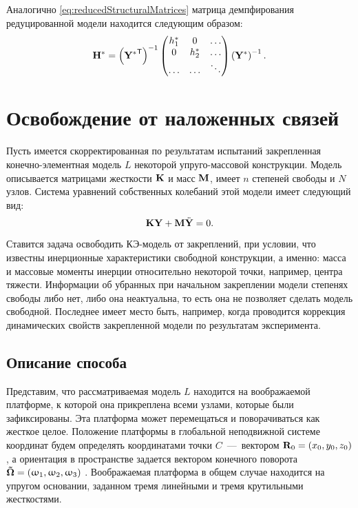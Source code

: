 Аналогично \eqref{eq:reducedStructuralMatrices} матрица демпфирования редуцированной модели находится следующим образом:
\begin{equation}
	\mathbf{H} ^ \ast = 
	\left( \mathbf{Y ^ \ast} ^ \mathsf{T} \right) ^ {-1} 
	\begin{pmatrix}
		h_1^\ast & 0 & \hdots \\
		0 & h_2^\ast & \hdots \\
		\hdots & \hdots & \ddots
	\end{pmatrix} 
	\left( \mathbf{Y} ^ \ast \right) ^ {-1}.
	\label{eq:reducedDampingMatrix}
\end{equation}

\section{Освобождение от наложенных связей} \label{struct:freeing}

Пусть имеется скорректированная по результатам испытаний закрепленная конечно-элементная модель $ L $ некоторой упруго-массовой конструкции. Модель описывается матрицами жесткости $ \mathbf{K} $  и масс $ \mathbf{M} $, имеет $ n $  степеней свободы и $ N $ узлов. Система уравнений собственных колебаний этой модели имеет следующий вид:
\begin{equation}
	\mathbf{K} \mathbf{Y} + \mathbf{M} \ddot{\mathbf{Y}} = 0.
	\label{eq:eigFreeProblem}
\end{equation}

Ставится задача освободить КЭ-модель от закреплений, при условии, что известны инерционные характеристики свободной конструкции, а именно: масса и массовые моменты инерции относительно некоторой точки, например, центра тяжести. Информации об убранных при начальном закреплении модели степенях свободы либо нет, либо она неактуальна, то есть она не позволяет сделать модель свободной. Последнее имеет место быть, например, когда проводится коррекция динамических свойств закрепленной модели по результатам эксперимента.

\subsection{Описание способа}

Представим, что рассматриваемая модель $ L $ находится на воображаемой платформе, к которой она прикреплена всеми узлами, которые были зафиксированы. Эта платформа может перемещаться и поворачиваться как жесткое целое. Положение платформы в глобальной неподвижной системе координат будем определять координатами точки $ C $~---~вектором $ \mathbf{R}_0 = (x_0, y_0, z_0) $, а ориентация в пространстве задается вектором конечного поворота $ \mathbf{\vec{\mathbf{\Omega}}} = (\upomega_1, \upomega_2, \upomega_3) $ . Воображаемая платформа в общем случае находится на упругом основании, заданном тремя линейными и тремя крутильными жесткостями.

